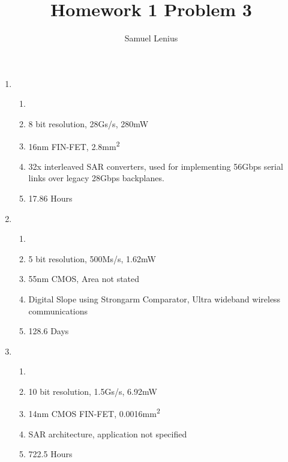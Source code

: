 \documentclass[conference]{IEEEtran}
\title{Homework 1 Problem 3}
\author{Samuel Lenius}
\begin{document}
\maketitle


\begin{enumerate}
  \item
    \begin{enumerate}[label=(\alph*)]
      \item \cite{7811205}
      \item 8 bit resolution, 28Gs/s, 280mW
      \item 16nm FIN-FET, 2.8mm\textsuperscript{2}
      \item 32x interleaved SAR converters, used for implementing 56Gbps serial links over legacy 28Gbps backplanes.
      \item 17.86 Hours
    \end{enumerate}
  \item
    \begin{enumerate}[label=(\alph*)]
      \item \cite{7904657}
      \item 5 bit resolution, 500Ms/s, 1.62mW
      \item 55nm CMOS, Area not stated
      \item Digital Slope using Strongarm Comparator, Ultra wideband wireless communications
      \item 128.6 Days
    \end{enumerate}
  \item
    \begin{enumerate}[label=(\alph*)]
      \item \cite{7870467}
      \item 10 bit resolution, 1.5Gs/s, 6.92mW
      \item 14nm CMOS FIN-FET, 0.0016mm\textsuperscript{2}
      \item SAR architecture, application not specified
      \item 722.5 Hours
    \end{enumerate}
\end{enumerate}


\end{document}
